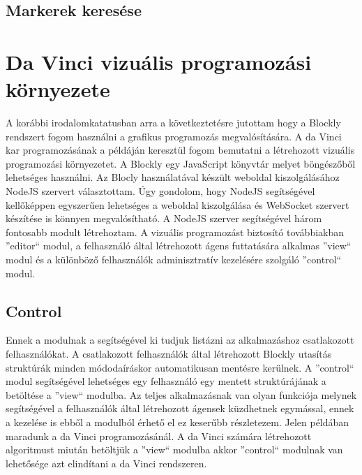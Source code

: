 \documentclass[12pt,a4paper,oneside]{report} %
\begin{document}
\subsection{Markerek keresése}

\section{Da Vinci vizuális programozási környezete}
A korábbi irodalomkatatusban arra a következtetésre jutottam hogy a Blockly rendszert fogom használni a  grafikus programozás megvalósítására.
A da Vinci kar programozásának a példáján keresztül fogom bemutatni a létrehozott vizuális programozási környezetet.
A Blockly egy JavaScript könyvtár melyet böngészőből lehetséges használni. Az Blocly használatával készült weboldal kiszolgálásához NodeJS szervert választottam. Úgy gondolom, hogy NodeJS segítségével kellőképpen egyszerűen lehetséges a weboldal kiszolgálása és WebSocket szervert készítése is könnyen megvalósítható. A NodeJS szerver segítségével három fontosabb modult létrehoztam. A vizuális programozást biztosító továbbiakban ''editor`` modul, a felhasználó által létrehozott ágens futtatására alkalmas ''view`` modul és a különböző felhasználók adminisztratív kezelésére szolgáló ''control`` modul.
\subsection{Control}
Ennek a modulnak a segítségével ki tudjuk listázni az alkalmazáshoz csatlakozott felhasználókat. A csatlakozott felhasználók által létrehozott Blockly utasítás struktúrák minden módodaíráskor automatikusan mentésre kerülnek. A ''control`` modul segítségével lehetséges egy felhasználó egy mentett struktúrájának a betöltése a  ''view`` modulba. Az teljes alkalmazásnak van olyan funkciója melynek segítségével a felhasználók által létrehozott ágensek küzdhetnek egymással, ennek a kezelése is ebből a modulból érhető el ez keserűbb részletezem. Jelen példában maradunk a da Vinci programozásánál. A da Vinci számára létrehozott algoritmust miután betöltjük a ''view`` modulba akkor ''control`` modulnak van lehetősége azt elindítani a da Vinci rendszeren. 
\end{document}
